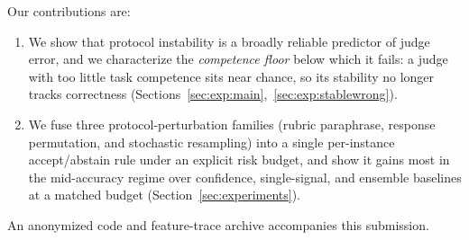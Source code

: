 Our contributions are:
\begin{enumerate}
    \item We show that protocol instability is a broadly reliable predictor of judge error, and we characterize the \emph{competence floor} below which it fails: a judge with too little task competence sits near chance, so its stability no longer tracks correctness (Sections~\ref{sec:exp:main},~\ref{sec:exp:stablewrong}).
    \item We fuse three protocol-perturbation families (rubric paraphrase, response permutation, and stochastic resampling) into a single per-instance accept/abstain rule under an explicit risk budget, and show it gains most in the mid-accuracy regime over confidence, single-signal, and ensemble baselines at a matched budget (Section~\ref{sec:experiments}).
\end{enumerate}
An anonymized code and feature-trace archive accompanies this submission.
